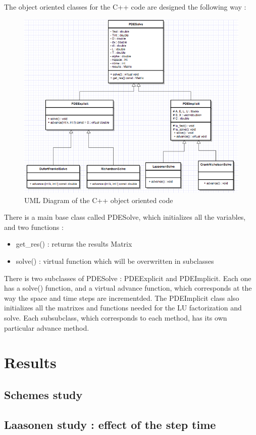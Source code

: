 \documentclass{article}
\begin{document}
            The object oriented classes for the C++ code are designed the following way :\\
            \begin{figure}[H]
                \includegraphics[width=\textwidth]{UML.png}
                \caption{UML Diagram of the C++ object oriented code}
            \end{figure}
            There is a main base class called PDESolve, which initializes all the variables, and two functions :
            \begin{itemize}
                \item{get\_res() : returns the results Matrix}
                \item{solve() : virtual function which will be overwritten in subclasses}
            \end{itemize}
            There is two subclasses of PDESolve : PDEExplicit and PDEImplicit. Each one has a solve() function, and a virtual advance function,
            which corresponds at the way the space and time steps are incrementded.
            The PDEImplicit class also initializes all the matrixes and functions needed for the LU factorization and solve.
            Each subsubclass, which corresponds to each method, has its own particular advance method.
    \newpage
    \section{Results}
        \subsection{Schemes study}
        \subsection{Laasonen study : effect of the step time}











\end{document}
